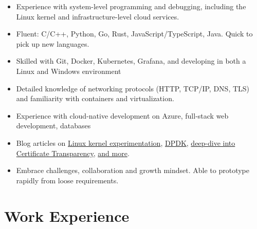   \begin{itemize}
    \setlength\itemsep{0.1\parskip}
    \item Experience with system-level programming and debugging, including the Linux kernel and infrastructure-level cloud services.
    \item Fluent: C/C++, Python, Go, Rust, JavaScript/TypeScript, Java. Quick to pick up new languages.
    \item Skilled with Git, Docker, Kubernetes, Grafana, and developing in both a Linux and Windows environment
    \item Detailed knowledge of networking protocols (HTTP, TCP/IP, DNS, TLS) and familiarity with containers and virtualization.
    \item Experience with cloud-native development on Azure, full-stack web development, databases
    \item Blog articles on \href{https://draft.blog.maowtm.org/linux-ick/en}{\color{link}Linux kernel experimentation}, \href{https://blog.maowtm.org/dpdk/en.html}{\color{link}DPDK}, \href{https://blog.maowtm.org/ct/en.html}{\color{link}deep-dive into Certificate Transparency}, \href{https://blog.maowtm.org/}{\color{link}and more}.
    \item Embrace challenges, collaboration and growth mindset. Able to prototype rapidly from loose requirements.
  \end{itemize}

  \section{Work Experience}

